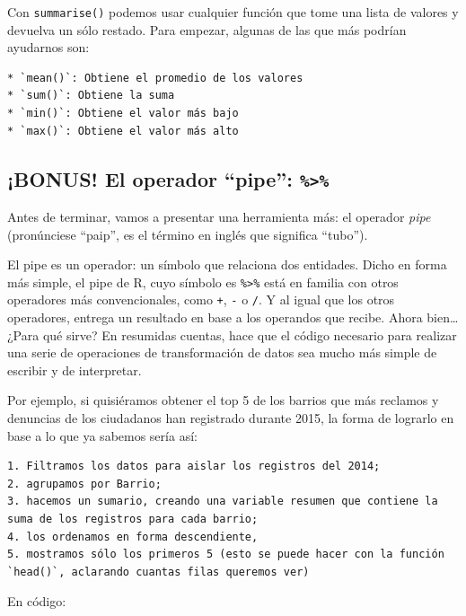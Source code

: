 \documentclass[spanish,]{book}
\begin{document}
Con \texttt{summarise()} podemos usar cualquier función que tome una lista de valores y devuelva un sólo restado. Para empezar, algunas de las que más podrían ayudarnos son:

\begin{verbatim}
* `mean()`: Obtiene el promedio de los valores
* `sum()`: Obtiene la suma
* `min()`: Obtiene el valor más bajo
* `max()`: Obtiene el valor más alto
\end{verbatim}

\hypertarget{bonus-el-operador-pipe}{%
\subsection{\texorpdfstring{¡BONUS! El operador ``pipe'': \texttt{\%\textgreater{}\%}}{¡BONUS! El operador ``pipe'': \%\textgreater{}\%}}\label{bonus-el-operador-pipe}}

Antes de terminar, vamos a presentar una herramienta más: el operador \emph{pipe} (pronúnciese ``paip'', es el término en inglés que significa ``tubo'').

El pipe es un operador: un símbolo que relaciona dos entidades. Dicho en forma más simple, el pipe de R, cuyo símbolo es \texttt{\%\textgreater{}\%} está en familia con otros operadores más convencionales, como \texttt{+}, \texttt{-} o \texttt{/}. Y al igual que los otros operadores, entrega un resultado en base a los operandos que recibe. Ahora bien\ldots{} ¿Para qué sirve? En resumidas cuentas, hace que el código necesario para realizar una serie de operaciones de transformación de datos sea mucho más simple de escribir y de interpretar.

Por ejemplo, si quisiéramos obtener el top 5 de los barrios que más reclamos y denuncias de los ciudadanos han registrado durante 2015, la forma de lograrlo en base a lo que ya sabemos sería así:

\begin{verbatim}
1. Filtramos los datos para aislar los registros del 2014;
2. agrupamos por Barrio;
3. hacemos un sumario, creando una variable resumen que contiene la suma de los registros para cada barrio;
4. los ordenamos en forma descendiente,
5. mostramos sólo los primeros 5 (esto se puede hacer con la función `head()`, aclarando cuantas filas queremos ver)
\end{verbatim}

En código:
\end{document}

